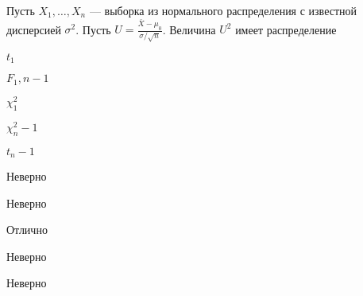 
\begin{question}
Пусть \(X_1,\ldots,X_n\) --- выборка из нормального распределения с
известной дисперсией \(\sigma^2\). Пусть
\(U = \frac{\bar{X}-\mu_0}{\sigma/\sqrt{n}}\). Величина \(U^2\) имеет
распределение
\begin{answerlist}
  \item \(t_1\)
  \item \(F_1,n-1\)
  \item \(\chi^2_1\)
  \item \(\chi^2_n-1\)
  \item \(t_n-1\)
\end{answerlist}
\end{question}

\begin{solution}
\begin{answerlist}
  \item Неверно
  \item Неверно
  \item Отлично
  \item Неверно
  \item Неверно
\end{answerlist}
\end{solution}

